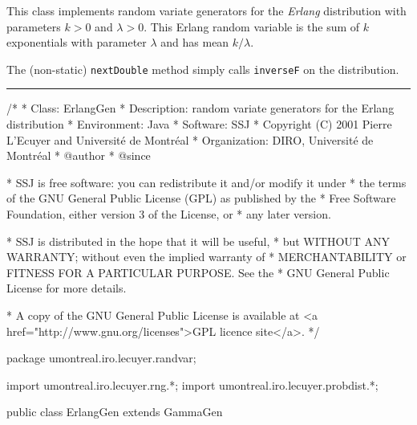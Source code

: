 
This class implements random variate generators for the {\em Erlang\/} 
distribution with parameters $k > 0$ and $\lambda > 0$.
This Erlang random variable is the sum of $k$ exponentials with 
parameter $\lambda$ and has mean $k/\lambda$.

The (non-static) \texttt{nextDouble} method simply calls \texttt{inverseF} on the
distribution. 


\bigskip\hrule

\begin{code}
\begin{hide}
/*
 * Class:        ErlangGen
 * Description:  random variate generators for the Erlang distribution
 * Environment:  Java
 * Software:     SSJ 
 * Copyright (C) 2001  Pierre L'Ecuyer and Université de Montréal
 * Organization: DIRO, Université de Montréal
 * @author       
 * @since

 * SSJ is free software: you can redistribute it and/or modify it under
 * the terms of the GNU General Public License (GPL) as published by the
 * Free Software Foundation, either version 3 of the License, or
 * any later version.

 * SSJ is distributed in the hope that it will be useful,
 * but WITHOUT ANY WARRANTY; without even the implied warranty of
 * MERCHANTABILITY or FITNESS FOR A PARTICULAR PURPOSE.  See the
 * GNU General Public License for more details.

 * A copy of the GNU General Public License is available at
   <a href="http://www.gnu.org/licenses">GPL licence site</a>.
 */
\end{hide}
package umontreal.iro.lecuyer.randvar;\begin{hide}
import umontreal.iro.lecuyer.rng.*;
import umontreal.iro.lecuyer.probdist.*;
\end{hide}

public class ErlangGen extends GammaGen \begin{hide} {
   protected int    k = -1;

\end{hide}\end{code}

